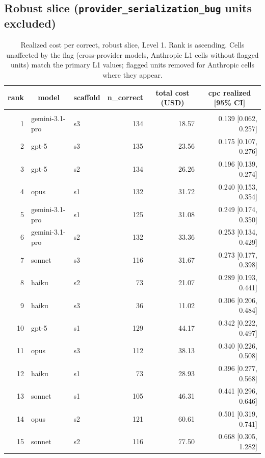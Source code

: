 \documentclass[10pt]{article} %
\begin{document}
    \subsection{Robust slice (\texttt{provider\_serialization\_bug} units excluded)}\label{app:cpc_robust}
    
        \begin{table}[t]
            \caption{Realized cost per correct, robust slice, Level 1. Rank is ascending. Cells unaffected by the flag (cross-provider models, Anthropic L1 cells without flagged units) match the primary L1 values; flagged units removed for Anthropic cells where they appear.}
        \label{tab:cpc_robust_L1_ranked}
        \begin{center}
        \small
        \begin{tabular}{rllrrr}
            \multicolumn{1}{c}{\bf rank} & \multicolumn{1}{c}{\bf model} & \multicolumn{1}{c}{\bf scaffold} & \multicolumn{1}{c}{\bf n\_correct} & \multicolumn{1}{c}{\bf total cost (USD)} & \multicolumn{1}{c}{\bf cpc realized [95\% CI]} \\
            \hline \\
            1 & gemini-3.1-pro & s3 & 134 & 18.57 & 0.139 [0.062, 0.257] \\
            2 & gpt-5 & s3 & 135 & 23.56 & 0.175 [0.107, 0.276] \\
            3 & gpt-5 & s2 & 134 & 26.26 & 0.196 [0.139, 0.274] \\
            4 & opus & s1 & 132 & 31.72 & 0.240 [0.153, 0.354] \\
            5 & gemini-3.1-pro & s1 & 125 & 31.08 & 0.249 [0.174, 0.350] \\
            6 & gemini-3.1-pro & s2 & 132 & 33.36 & 0.253 [0.134, 0.429] \\
            7 & sonnet & s3 & 116 & 31.67 & 0.273 [0.177, 0.398] \\
            8 & haiku & s2 & 73 & 21.07 & 0.289 [0.193, 0.441] \\
            9 & haiku & s3 & 36 & 11.02 & 0.306 [0.206, 0.484] \\
            10 & gpt-5 & s1 & 129 & 44.17 & 0.342 [0.222, 0.497] \\
            11 & opus & s3 & 112 & 38.13 & 0.340 [0.226, 0.508] \\
            12 & haiku & s1 & 73 & 28.93 & 0.396 [0.277, 0.568] \\
            13 & sonnet & s1 & 105 & 46.31 & 0.441 [0.296, 0.646] \\
            14 & opus & s2 & 121 & 60.61 & 0.501 [0.319, 0.741] \\
            15 & sonnet & s2 & 116 & 77.50 & 0.668 [0.305, 1.282] \\
        \end{tabular}
        \end{center}
        \end{table}
        
\end{document}
